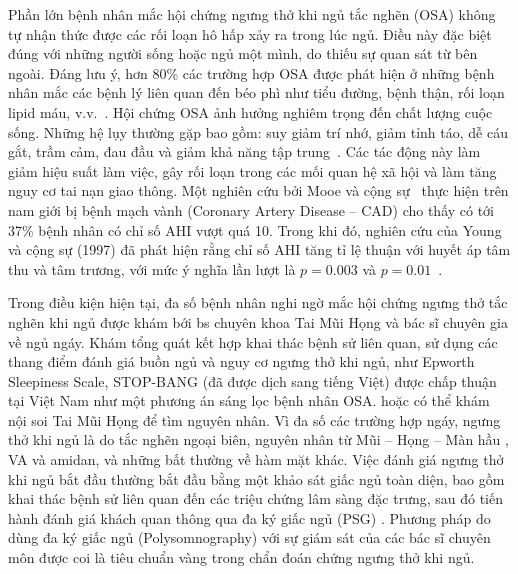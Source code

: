 Phần lớn bệnh nhân mắc hội chứng ngưng thở khi ngủ tắc nghẽn 
(\gls{OSA}) không tự nhận thức được các rối loạn hô hấp xảy ra trong lúc ngủ. 
Điều này đặc biệt đúng với những người sống hoặc ngủ một mình, 
do thiếu sự quan sát từ bên ngoài. Đáng lưu ý, hơn 80\% các 
trường hợp OSA được phát hiện ở những bệnh nhân mắc các 
bệnh lý liên quan đến béo phì như tiểu đường, bệnh thận, rối loạn lipid máu, v.v.~\cite{wright1997health}.
Hội chứng OSA ảnh hưởng nghiêm trọng đến chất lượng cuộc sống. 
Những hệ lụy thường gặp bao gồm: suy giảm trí nhớ, giảm tỉnh táo, 
dễ cáu gắt, trầm cảm, đau đầu và giảm khả năng tập trung~\cite{flemons1997quality}. Các tác động này làm giảm hiệu suất làm việc, gây rối loạn trong các mối quan hệ xã hội và làm tăng nguy cơ tai nạn giao thông.
Một nghiên cứu bởi Mooe và cộng sự~\cite{mooe1996sleep} 
thực hiện trên nam giới bị bệnh mạch vành (Coronary Artery Disease – CAD) 
cho thấy có tới 37\% bệnh nhân có chỉ số AHI vượt quá 10. 
Trong khi đó, nghiên cứu của Young và cộng sự (1997) đã phát hiện rằng chỉ số 
AHI tăng tỉ lệ thuận với huyết áp tâm thu và tâm trương, với mức ý nghĩa lần lượt 
là $p=0.003$ và $p=0.01$~\cite{young1997population}.

Trong điều kiện hiện tại, đa số bệnh nhân nghi ngờ mắc 
hội chứng ngưng thở tắc nghẽn khi ngủ được khám bới 
bs chuyên khoa Tai Mũi Họng và bác sĩ chuyên gia về ngủ ngáy. 
Khám tổng quát kết hợp khai thác bệnh sử liên quan, sử dụng các thang điểm đánh 
giá buồn ngủ và nguy cơ ngưng thở khi ngủ, như Epworth Sleepiness Scale, STOP-BANG (đã được dịch sang tiếng Việt) được chấp thuận tại Việt Nam như một phương án sáng lọc bệnh nhân OSA. 
hoặc có thể khám nội soi Tai Mũi Họng để tìm nguyên nhân. 
Vì đa số các trường hợp ngáy, ngưng thở khi ngủ là do tắc nghẽn 
ngoại biên, nguyên nhân từ Mũi – Họng – Màn hầu , VA và amidan, 
và những bất thường về hàm mặt khác. 
Việc đánh giá ngưng thở khi ngủ bắt đầu thường bắt đầu bằng 
một khảo sát giấc ngủ toàn diện, bao gồm khai thác bệnh sử liên quan đến 
các triệu chứng lâm sàng đặc trưng, 
sau đó tiến hành đánh giá khách quan thông qua đa ký giấc ngủ (PSG) \cite{diagnosis_osa}\cite{medical2006polysomnography}.
Phương pháp do dùng đa ký giấc ngủ (Polysomnography) với sự giám sát của các bác sĩ chuyên môn được coi là tiêu chuẩn vàng trong chẩn đoán chứng ngưng thở khi ngủ. 


